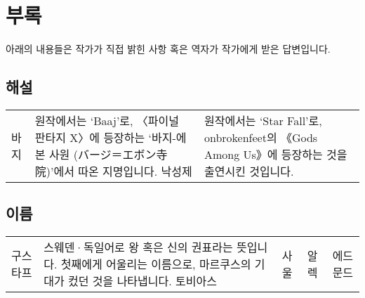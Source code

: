 \chapter{부록}

\textsf{아래의 내용들은 작가가 직접 밝힌 사항 혹은 역자가 작가에게 받은 답변입니다.}

\section*{ 해설}

\begin{tabularx}{\textwidth}{l X}
	\textsf{바지} & 원작에서는 `Baaj'로, 〈파이널 판타지 X〉에 등장하는 `바지-에본 사원 (バージ＝エボン寺院)'에서 따온 지명입니다.
	\textsf{낙성제} & 원작에서는 `Star Fall'로, onbrokenfeet의 《Gods Among Us》에 등장하는 것을 출연시킨 것입니다.
\end{tabularx}

\section*{ 이름}

\begin{tabularx}{\textwidth}{l X}
	\textsf{구스타프} & 스웨덴·독일어로 왕 혹은 신의 권표라는 뜻입니다. 첫째에게 어울리는 이름으로, 마르쿠스의 기대가 컸던 것을 나타냅니다.
	\textsf{토비아스} & 
	\textsf{사울} & 
	\textsf{알렉} & 
	\textsf{에드문드} & 
\end{tabularx}
